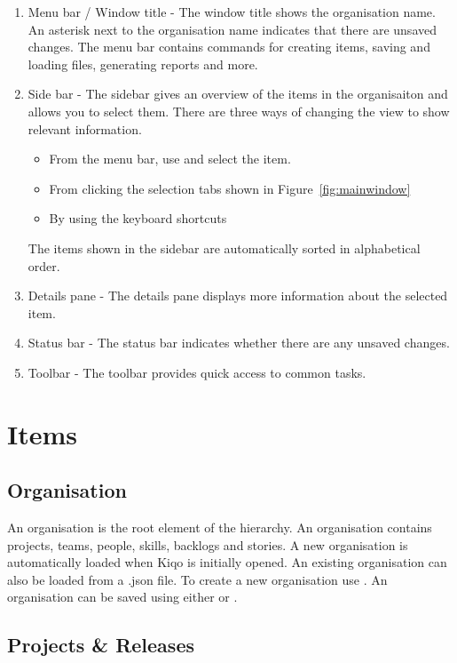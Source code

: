 \documentclass[11pt,fleqn]{book} %
\begin{document}
\begin{enumerate}
\item Menu bar / Window title - The window title shows the organisation name. An asterisk next to the organisation name indicates that there are unsaved changes.
The menu bar contains commands for creating items, saving and loading files, generating reports and more.
\item Side bar - The sidebar gives an overview of the items in the organisaiton and allows you to select them.
There are three ways of changing the view to show relevant information.
    \begin{itemize}
      \item From the menu bar, use  and select the item.
      \item From clicking the selection tabs shown in Figure~\ref{fig:mainwindow}
      \item By using the keyboard shortcuts 
    \end{itemize}
    The items shown in the sidebar are automatically sorted in alphabetical order.
\item Details pane - The details pane displays more information about the selected item.
\item Status bar - The status bar indicates whether there are any unsaved changes.
\item Toolbar - The toolbar provides quick access to common tasks.
\end{enumerate}


\chapter{Items}
\section{Organisation}
An organisation is the root element of the hierarchy. An organisation contains projects, teams, people, skills, backlogs and stories.
A new organisation is automatically loaded when Kiqo is initially opened. An existing organisation can also be loaded
from a .json file. To create a new organisation use . An organisation can be saved using
either  or .

\section{Projects \& Releases}
\end{document}
